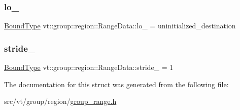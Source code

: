\subsubsection{\texorpdfstring{lo\+\_\+}{lo\_}}
{\footnotesize\ttfamily \hyperlink{structvt_1_1group_1_1region_1_1_range_data_a12ca75365c79bece7d169149b354011d}{Bound\+Type} vt\+::group\+::region\+::\+Range\+Data\+::lo\+\_\+ = uninitialized\+\_\+destination\hspace{0.3cm}{\ttfamily [private]}}

\mbox{\label{structvt_1_1group_1_1region_1_1_range_data_a8f40ed5e914ee5f68c7f274df5cba1dd}} 
\subsubsection{\texorpdfstring{stride\+\_\+}{stride\_}}
{\footnotesize\ttfamily \hyperlink{structvt_1_1group_1_1region_1_1_range_data_a12ca75365c79bece7d169149b354011d}{Bound\+Type} vt\+::group\+::region\+::\+Range\+Data\+::stride\+\_\+ = 1\hspace{0.3cm}{\ttfamily [private]}}



The documentation for this struct was generated from the following file\+:\begin{DoxyCompactItemize}
\item 
src/vt/group/region/\hyperlink{group__range_8h}{group\+\_\+range.\+h}\end{DoxyCompactItemize}
